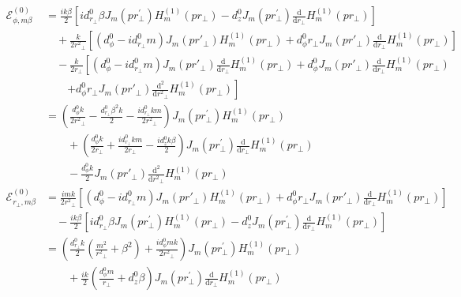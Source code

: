 \documentclass[]{report}
\begin{document}
\begin{align}
\mathcal{E}_{\phi,m\beta}^{(0)} &= \frac{ik\beta}{2}\left[ id^0_{r\!_\perp}\beta J_{m}\left( {pr\!_\perp^{\prime} }\right) H_{m}^{\left( {1}\right) }\left( pr_\perp \right)-d^0_z J_{m}\left( {pr\!_\perp^{\prime} }\right) \frac{\mathrm{d}}{\mathrm{d}r\!_\perp}H_{m}^{\left( {1}\right) }\left( pr_\perp \right) \right]\nonumber\\
&\quad +\frac{k}{2r^2\!\!_\perp}\left[(d^0_\phi\!-\! id^0_{r\!_\perp}m) J_m(pr'\!\!_\perp)H_m^{(1)}(pr\!_\perp) \!+\! d^0_\phi r\!_\perp J_m(pr'\!_\perp) \frac{\mathrm{d}}{\mathrm{d}r\!_\perp}H_m^{(1)}(pr\!_\perp)\right]\nonumber\\
&\quad -\! \frac{k}{2r\!_\perp}\left[(d^0_\phi\!-\! id^0_{r\!_\perp}m) J_m(pr'\!\!_\perp)\frac{\mathrm{d}}{\mathrm{d}r\!_\perp}H_m^{(1)}(pr\!_\perp) \!+\! d^0_\phi  J_m(pr'\!_\perp) \frac{\mathrm{d}}{\mathrm{d}r\!_\perp}H_m^{(1)}(pr\!_\perp)\right. \nonumber\\
&\qquad\left. + d^0_\phi r\!_\perp  J_m(pr'\!_\perp) \frac{\mathrm{d}^2}{\mathrm{d}r^2\!\!_\perp}H_m^{(1)}(pr\!_\perp) \right]\\
&= (\frac{d^0_\phi k}{2r^2\!\!_\perp}-\frac{d^0_{r\!_\perp}\beta^2k}{2}-\frac{id^0_{r\!_\perp}km}{2r^2\!\!_\perp}) J_{m}\left( {pr\!_\perp^{\prime} }\right) H_{m}^{\left( {1}\right) }\left( pr_\perp \right)\nonumber\\
&\qquad +( \frac{d^0_\phi k}{2r\!_\perp }+\frac{id^0_{r\!_\perp}km}{2r\!_\perp}-\frac{id^0_zk\beta}{2} ) J_{m}\left( {pr\!_\perp^{\prime} }\right) \frac{\mathrm{d}}{\mathrm{d}r\!_\perp}H_{m}^{\left( {1}\right) }\left( pr_\perp \right)\nonumber\\
&\qquad - \frac{d^0_\phi k}{2}  J_m(pr'\!_\perp) \frac{\mathrm{d}^2}{\mathrm{d}r^2\!\!_\perp}H_m^{(1)}(pr\!_\perp)\\
\mathcal{E}_{r\!_\perp,m\beta}^{(0)} &= \frac{imk}{2r^2\!\!_\perp}\left[(d^0_\phi\!-\! id^0_{r\!_\perp}m) J_m(pr'\!\!_\perp)H_m^{(1)}(pr\!_\perp) \!+\! d^0_\phi r\!_\perp J_m(pr'\!_\perp) \frac{\mathrm{d}}{\mathrm{d}r\!_\perp}H_m^{(1)}(pr\!_\perp)\right]\nonumber\\
&\quad -\! \frac{ik\beta}{2}\left[ id^0_{r\!_\perp}\beta J_{m}\left( {pr\!_\perp^{\prime} }\right) H_{m}^{\left( {1}\right) }\left( pr\!_\perp \right) \!-\! d^0_z J_{m}\left( {pr\!_\perp^{\prime} }\right) \frac{\mathrm{d}}{\mathrm{d}r\!_\perp}H_{m}^{\left( {1}\right) }\left( pr\!_\perp \right) \right]\\
&= \left(\frac{d^0_{r\!_\perp} k}{2}(\frac{m^2}{r^2\!\!_\perp}+\beta^2)+\frac{id^0_\phi mk}{2r^2\!\!_\perp}\right)J_{m}\left( {pr\!_\perp^{\prime} }\right) H_{m}^{\left( {1}\right) }\left( pr\!_\perp \right)\nonumber\\
&\qquad +\frac{ik}{2}(\frac{d^0_\phi m}{r\!_\perp}+d^0_z \beta)J_{m}\left( {pr\!_\perp^{\prime} }\right) \frac{\mathrm{d}}{\mathrm{d}r\!_\perp}H_{m}^{\left( {1}\right) }\left( pr\!_\perp \right)
\end{align}
 
\end{document}
